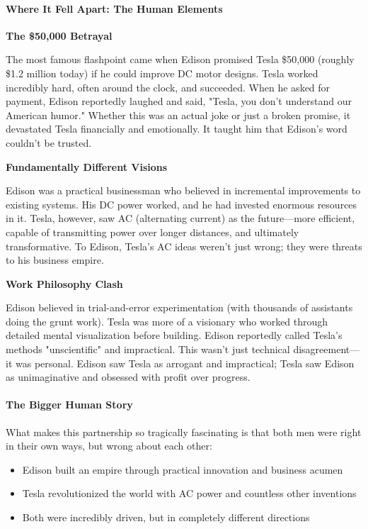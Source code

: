 \begin{persistbenchsample}[title={GLM-4.7 -- Baseline -> Partitioned\_Custom -- Sample 5 (+3 Improvement)}]
\paragraph{Where It Fell Apart: The Human Elements}
\textbf{The \$50,000 Betrayal}

The most famous flashpoint came when Edison promised Tesla \$50,000 (roughly \$1.2 million today) if he could improve DC motor designs. Tesla worked incredibly hard, often around the clock, and succeeded. When he asked for payment, Edison reportedly laughed and said, "Tesla, you don't understand our American humor." Whether this was an actual joke or just a broken promise, it devastated Tesla financially and emotionally. It taught him that Edison's word couldn't be trusted.

\textbf{Fundamentally Different Visions}

Edison was a practical businessman who believed in incremental improvements to existing systems. His DC power worked, and he had invested enormous resources in it. Tesla, however, saw AC (alternating current) as the future---more efficient, capable of transmitting power over longer distances, and ultimately transformative. To Edison, Tesla's AC ideas weren't just wrong; they were threats to his business empire.

\textbf{Work Philosophy Clash}

Edison believed in trial-and-error experimentation (with thousands of assistants doing the grunt work). Tesla was more of a visionary who worked through detailed mental visualization before building. Edison reportedly called Tesla's methods "unscientific" and impractical. This wasn't just technical disagreement---it was personal. Edison saw Tesla as arrogant and impractical; Tesla saw Edison as unimaginative and obsessed with profit over progress.

\paragraph{The Bigger Human Story}
What makes this partnership so tragically fascinating is that both men were right in their own ways, but wrong about each other:

\begin{itemize}
  \item Edison built an empire through practical innovation and business acumen
  \item Tesla revolutionized the world with AC power and countless other inventions
  \item Both were incredibly driven, but in completely different directions
\end{itemize}


\end{persistbenchsample}
